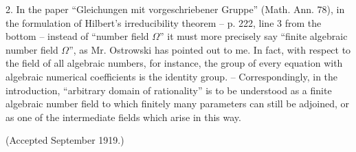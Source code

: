 \documentclass[11pt]{article}
\begin{document}
2. In the paper ``Gleichungen mit vorgeschriebener Gruppe'' (Math. Ann. 78), in the formulation of Hilbert's irreducibility theorem -- p. 222, line 3 from the bottom -- instead of ``number field $\Omega$'' it must more precisely say ``finite algebraic number field $\Omega$'', as Mr. Ostrowski has pointed out to me. In fact, with respect to the field of all algebraic numbers, for instance, the group of every equation with algebraic numerical coefficients is the identity group. -- Correspondingly, in the introduction, ``arbitrary domain of rationality'' is to be understood as a finite algebraic number field to which finitely many parameters can still be adjoined, or as one of the intermediate fields which arise in this way.

\begin{center}
(Accepted September 1919.)
\end{center}
\end{document}
